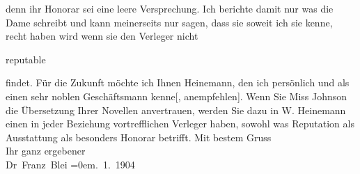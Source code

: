 \begin{ledgroupsized}[t]{13cm}
                    denn ihr Honorar sei eine leere Versprechung. Ich berichte damit nur was die Dame schreibt und kann
                    meinerseits nur sagen, dass sie soweit ich sie kenne, recht haben wird wenn sie
                    den Verleger nicht
                        \begin{otherlanguage}{english}reputable\end{otherlanguage} findet. Für die Zukunft möchte
                    ich Ihnen Heinemann, den ich persönlich und als
                    einen sehr noblen Geschäftsmann {\pb}kenne{[}, anempfehlen{]}. Wenn Sie Miss Johnson die Übersetzung Ihrer Novellen anvertrauen,
                    werden Sie dazu in W. Heinemann einen in
                    jeder Beziehung vortrefflichen Verleger haben, sowohl was Reputation als
                    Ausstattung als besonders Honorar betrifft.\pend
           \pstart
           Mit bestem Gruss{\\[\baselineskip]}Ihr ganz ergebener{\\[\baselineskip]}\spacefill\mbox{Dr Franz Blei}\pend
           \leftskip=0em{}. 1. 1904\pend
                     \endnumbering{}\end{ledgroupsized}  \newcommand{\dateiname}{L01356}\newcommand{\titel}{Franz Blei an Arthur Schnitzler, 4. 1. 1904}\newcommand{\editorInnen}{Martin Anton Müller und Gerd-Hermann Susen}
      